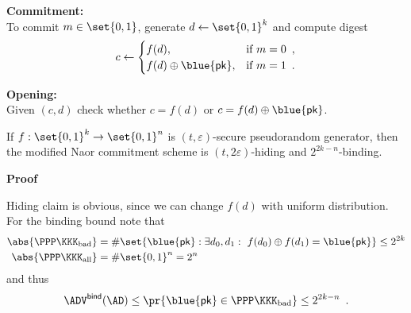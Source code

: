 \documentclass[landscape,footrule]{foils}
\newcommand{\lastline}{\vspace*{-2ex}}
\newcommand{\spreadappart}{\vspace*{\fill}}
\renewcommand{\PK}{{\blue{\mathsf{pk}}}}
\begin{document}
\textbf{Commitment:}\vspace*{1ex}\\
\hspace*{1.5em} To commit $m\in\set{0,1}$, generate
$d\gets\set{0,1}^k$ and compute digest
\begin{align*}
  c\gets
  \begin{cases}
    f(d),&\text{if } m=0 \enspace,\\
    f(d)\oplus\PK,&\text{if } m=1\enspace.
  \end{cases}
\end{align*}
\spreadappart

\textbf{Opening:}\vspace*{1ex}\\
\hspace*{1.5em} Given $(c,d)$ check whether $c=f(d)$ or $c=f(d)\oplus\PK$. 
\lastline


\enlargethispage{1cm}

If $f:\set{0,1}^k\to\set{0,1}^n$ is $(t,\varepsilon)$-secure
pseudorandom generator, then the modified Naor commitment scheme is
$(t,2\varepsilon)$-hiding and $2^{2k-n}$-binding. 

\textbf{Proof}

Hiding claim is obvious, since we can change $f(d)$ with uniform
distribution.  For the binding bound note that
\begin{align*}
 \abs{\PPP\KKK_{\mathrm{bad}}}&= \#\set{\PK:\exists d_0,d_1:\ f(d_0)\oplus f(d_1)=\PK}\leq 2^{2k}\\
 \abs{\PPP\KKK_{\mathrm{all}}}&= \#\set{0,1}^n= 2^{n}
\end{align*}
and thus
\begin{align*}
  \advBindXX{}{\AD}\leq \pr{\PK\in\PPP\KKK_{\mathrm{bad}}}\leq 2^{2k-n}\enspace.
\end{align*}


\end{document}

